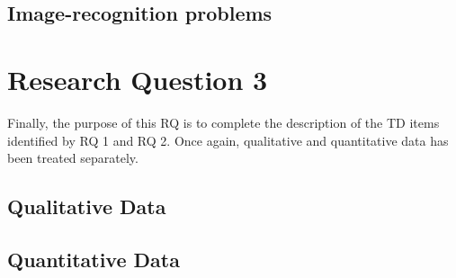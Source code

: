 \subsection{Image-recognition problems}


\section{Research Question 3}

Finally, the purpose of this RQ is to complete the description of the TD items identified by RQ 1 and RQ 2. Once again, qualitative and quantitative data has been treated separately.

\subsection{Qualitative Data}
    

\subsection{Quantitative Data}
    

